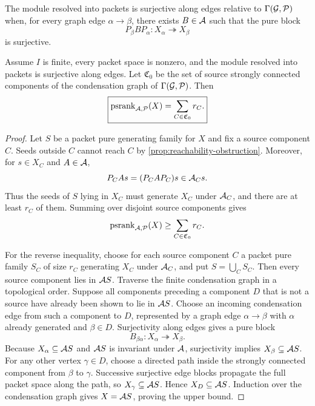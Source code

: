 \begin{definition}
\label{def:edge-surjective}
The module resolved into packets is surjective along edges relative to $\Gamma(\mathcal G,\mathcal P)$ when, for every graph edge $\alpha\to\beta$, there exists $B\in\mathcal A$ such that the pure block
\[
P_\beta BP_\alpha:X_\alpha\twoheadrightarrow X_\beta
\]
is surjective.
\end{definition}

\begin{theorem}
\label{thm:source-component-rank}
Assume $I$ is finite, every packet space is nonzero, and the module resolved into packets is surjective along edges.  Let $\mathfrak C_0$ be the set of source strongly connected components of the condensation graph of $\Gamma(\mathcal G,\mathcal P)$.  Then
\[
\boxed{
\operatorname{psrank}_{\mathcal A,\mathcal P}(X)
=
\sum_{C\in\mathfrak C_0}r_C.
}
\]
\end{theorem}

\begin{proof}
Let $S$ be a packet pure generating family for $X$ and fix a source component $C$.  Seeds outside $C$ cannot reach $C$ by \cref{prop:reachability-obstruction}.  Moreover, for $s\in X_C$ and $A\in\mathcal A$,
\[
P_CAs=(P_CAP_C)s\in\mathcal A_Cs.
\]
Thus the seeds of $S$ lying in $X_C$ must generate $X_C$ under $\mathcal A_C$, and there are at least $r_C$ of them.  Summing over disjoint source components gives
\[
\operatorname{psrank}_{\mathcal A,\mathcal P}(X)
\geq
\sum_{C\in\mathfrak C_0}r_C.
\]

For the reverse inequality, choose for each source component $C$ a packet pure family $S_C$ of size $r_C$ generating $X_C$ under $\mathcal A_C$, and put $S=\bigcup_CS_C$.  Then every source component lies in $\mathcal A S$.  Traverse the finite condensation graph in a topological order.  Suppose all components preceding a component $D$ that is not a source have already been shown to lie in $\mathcal A S$.  Choose an incoming condensation edge from such a component to $D$, represented by a graph edge $\alpha\to\beta$ with $\alpha$ already generated and $\beta\in D$.  Surjectivity along edges gives a pure block
\[
B_{\beta\alpha}:X_\alpha\twoheadrightarrow X_\beta.
\]
Because $X_\alpha\subseteq\mathcal A S$ and $\mathcal A S$ is invariant under $\mathcal A$, surjectivity implies $X_\beta\subseteq\mathcal A S$.  For any other vertex $\gamma\in D$, choose a directed path inside the strongly connected component from $\beta$ to $\gamma$.  Successive surjective edge blocks propagate the full packet space along the path, so $X_\gamma\subseteq\mathcal A S$.  Hence $X_D\subseteq\mathcal A S$.  Induction over the condensation graph gives $X=\mathcal A S$, proving the upper bound.
\end{proof}

